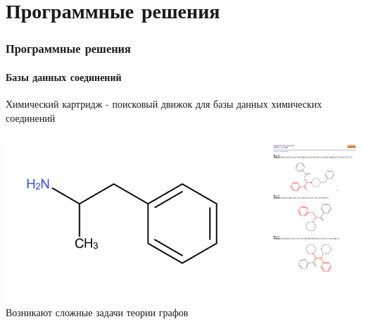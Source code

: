\section{Программные решения}
\begin{frame}
  \frametitle{Программные решения}
  \framesubtitle{Базы данных соединений}
  Химический картридж - поисковый движок для базы данных химических соединений  \\
  \begin{columns}
    \begin{column}{0.5\textwidth}
  \includegraphics[scale=0.2]{images/amphetamine.pdf} \\
  Возникают сложные задачи теории графов
\end{column}
\begin{column}{0.5\textwidth}
 \includegraphics[scale=0.38]{images/substructure_search.png}
\end{column}
\end{columns}
  \end{frame}

